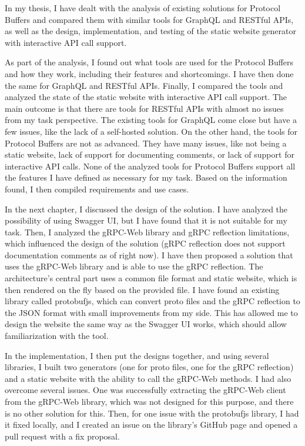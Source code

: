 In my thesis, I have dealt with the analysis of existing solutions for Protocol Buffers and compared them with similar tools for GraphQL and RESTful APIs, as well as the design, implementation, and testing of the static website generator with interactive API call support.

As part of the analysis, I found out what tools are used for the Protocol Buffers and how they work, including their features and shortcomings.
I have then done the same for GraphQL and RESTful APIs.
Finally, I compared the tools and analyzed the state of the static website with interactive API call support.
The main outcome is that there are tools for RESTful APIs with almost no issues from my task perspective.
The existing tools for GraphQL come close but have a few issues, like the lack of a self-hosted solution.
On the other hand, the tools for Protocol Buffers are not as advanced.
They have many issues, like not being a static website, lack of support for documenting comments, or lack of support for interactive API calls.
None of the analyzed tools for Protocol Buffers support all the features I have defined as necessary for my task.
Based on the information found, I then compiled requirements and use cases.

In the next chapter, I discussed the design of the solution.
I have analyzed the possibility of using Swagger UI, but I have found that it is not suitable for my task.
Then, I analyzed the gRPC-Web library and gRPC reflection limitations, which influenced the design of the solution (gRPC reflection does not support documentation comments as of right now).
I have then proposed a solution that uses the gRPC-Web library and is able to use the gRPC reflection.
The architecture's central part uses a common file format and static website, which is then rendered on the fly based on the provided file.
I have found an existing library called protobufjs, which can convert proto files and the gRPC reflection to the JSON format with small improvements from my side.
This has allowed me to design the website the same way as the Swagger UI works, which should allow familiarization with the tool.

In the implementation, I then put the designs together, and using several libraries, I built two generators (one for proto files, one for the gRPC reflection) and a static website with the ability to call the gRPC-Web methods.
I had also overcome several issues.
One was successfully extracting the gRPC-Web client from the gRPC-Web library, which was not designed for this purpose, and there is no other solution for this.
Then, for one issue with the protobufjs library, I had it fixed locally, and I created an issue on the library's GitHub page and opened a pull request with a fix proposal.

